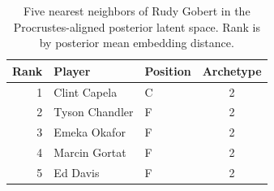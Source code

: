 \begin{table}[htbp]
  \centering\small
  \begin{tabular}{rllc}
    \toprule
    Rank & Player & Position & Archetype \\
    \midrule
    1 & Clint Capela & C & 2 \\
    2 & Tyson Chandler & F & 2 \\
    3 & Emeka Okafor & F & 2 \\
    4 & Marcin Gortat & F & 2 \\
    5 & Ed Davis & F & 2 \\
    \bottomrule
  \end{tabular}
  \caption{Five nearest neighbors of Rudy Gobert in the Procrustes-aligned posterior latent space. Rank is by posterior mean embedding distance.}
  \label{tab:Rudy_Gobert_neighbors}
\end{table}

